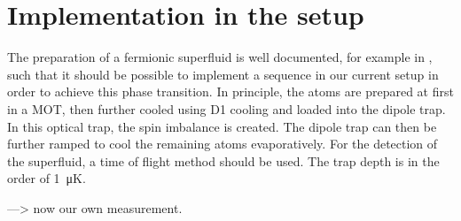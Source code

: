 \section{Implementation in the setup}

The preparation of a fermionic superfluid is well documented, for example in , such that it should be possible to implement a sequence in our current setup in order to achieve this phase transition. In principle, the atoms are prepared at first in a MOT, then further cooled using D1 cooling  and loaded into the dipole trap. In this optical trap, the spin imbalance is created. The dipole trap can then be further ramped to cool the remaining atoms evaporatively. For the detection of the superfluid, a time of flight method should be used. The trap depth is in the order of \SI{1}{\micro\kelvin}.

---> now our own measurement.
\fi